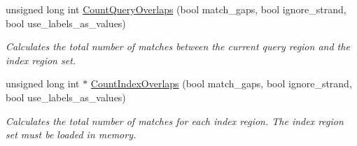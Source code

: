 \begin{CompactItemize}
unsigned long int \hyperlink{classGenomicRegionSetOverlaps_012372e8ca88ef24bead47db23ab8ee4}{CountQueryOverlaps} (bool match\_\-gaps, bool ignore\_\-strand, bool use\_\-labels\_\-as\_\-values)
\begin{CompactList}\small\item\em Calculates the total number of matches between the current query region and the index region set. \item\end{CompactList}\item 
unsigned long int $\ast$ \hyperlink{classGenomicRegionSetOverlaps_4b004114f9868c6a077d9207bd9b1901}{CountIndexOverlaps} (bool match\_\-gaps, bool ignore\_\-strand, bool use\_\-labels\_\-as\_\-values)
\begin{CompactList}\small\item\em Calculates the total number of matches for each index region. The index region set must be loaded in memory. \item\end{CompactList}\end{CompactItemize}
